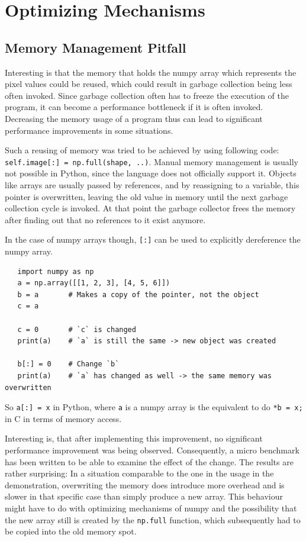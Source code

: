\documentclass[12pt, a4paper, titlepage]{report}
\begin{document}
\section{Optimizing Mechanisms}

\subsection{Memory Management Pitfall}

Interesting is that the memory that holds the numpy array which represents the pixel values could be reused, which could result in garbage collection being less often invoked. Since garbage collection often has to freeze the execution of the program, it can become a performance bottleneck if it is often invoked.      %
Decreasing the memory usage of a program thus can lead to significant performance improvements in some situations.

Such a reusing of memory was tried to be achieved by using following code: \lstinline{self.image[:] = np.full(shape, ..)}. Manual memory management is usually not possible in Python, since the language does not officially support it. Objects like arrays are usually passed by references, and by reassigning to a variable, this pointer is overwritten, leaving the old value in memory until the next garbage collection cycle is invoked. At that point the garbage collector frees the memory after finding out that no references to it exist anymore.      %

In the case of numpy arrays though, \lstinline{[:]} can be used to explicitly dereference the numpy array.

\begin{lstlisting}
   import numpy as np
   a = np.array([[1, 2, 3], [4, 5, 6]])
   b = a       # Makes a copy of the pointer, not the object
   c = a

   c = 0       # `c` is changed
   print(a)    # `a` is still the same -> new object was created

   b[:] = 0    # Change `b`
   print(a)    # `a` has changed as well -> the same memory was overwritten
\end{lstlisting}

So \lstinline{a[:] = x} in Python, where \lstinline{a} is a numpy array is the equivalent to do \lstinline{*b = x;} in C in terms of memory access.

Interesting is, that after implementing this improvement, no significant performance improvement was being observed. Consequently, a micro benchmark has been written to be able to examine the effect of the change. The results are rather surprising: In a situation comparable to the one in the usage in the demonstration, overwriting the memory does introduce more overhead and is slower in that specific case than simply produce a new array. This behaviour might have to do with optimizing mechanisms of numpy and the possibility that the new array still is created by the \lstinline{np.full} function, which subsequently had to be copied into the old memory spot.
\end{document}

